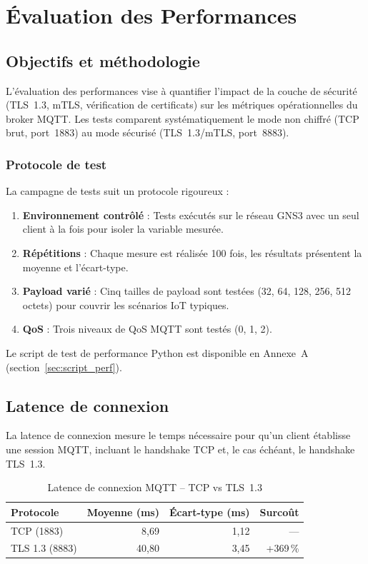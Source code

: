 \chapter{Évaluation des Performances}

\section{Objectifs et méthodologie}

L'évaluation des performances vise à quantifier l'impact de la couche de sécurité (TLS~1.3, mTLS, vérification de certificats) sur les métriques opérationnelles du broker MQTT. Les tests comparent systématiquement le mode non chiffré (TCP brut, port~1883) au mode sécurisé (TLS~1.3/mTLS, port~8883).

\subsection{Protocole de test}

La campagne de tests suit un protocole rigoureux :
\begin{enumerate}
  \item \textbf{Environnement contrôlé} : Tests exécutés sur le réseau GNS3 avec un seul client à la fois pour isoler la variable mesurée.
  \item \textbf{Répétitions} : Chaque mesure est réalisée 100 fois, les résultats présentent la moyenne et l'écart-type.
  \item \textbf{Payload varié} : Cinq tailles de payload sont testées (32, 64, 128, 256, 512 octets) pour couvrir les scénarios IoT typiques.
  \item \textbf{QoS} : Trois niveaux de QoS MQTT sont testés (0, 1, 2).
\end{enumerate}

Le script de test de performance Python est disponible en Annexe~A (section~\ref{sec:script_perf}).

\section{Latence de connexion}

La latence de connexion mesure le temps nécessaire pour qu'un client établisse une session MQTT, incluant le handshake TCP et, le cas échéant, le handshake TLS~1.3.

\begin{table}[H]
\centering
\caption{Latence de connexion MQTT -- TCP vs TLS~1.3}
\label{tab:conn_latency}
\begin{tabular}{lrrr}
\toprule
\textbf{Protocole} & \textbf{Moyenne (ms)} & \textbf{Écart-type (ms)} & \textbf{Surcoût} \\
\midrule
TCP (1883) & 8,69 & 1,12 & --- \\
TLS 1.3 (8883) & 40,80 & 3,45 & +369\,\% \\
\bottomrule
\end{tabular}
\end{table}

